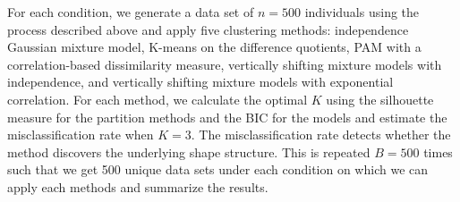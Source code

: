 \documentclass[12pt]{article}
\begin{document}
For each condition, we generate a data set of $n=500$ individuals using the process described above and apply five clustering methods: independence Gaussian mixture model, K-means on the difference quotients, PAM with a correlation-based dissimilarity measure, vertically shifting mixture models with independence, and vertically shifting mixture models with exponential correlation. For each method, we calculate the optimal $K$ using the silhouette measure \cite{kaufman1990}  for the partition methods and the BIC \cite{schwarz1978} for the models and estimate the misclassification rate when $K=3$. The misclassification rate detects whether the method discovers the underlying shape structure. This is repeated $B=500$ times such that we get 500 unique data sets under each condition on which we can apply each methods and summarize the results. 
\end{document}
